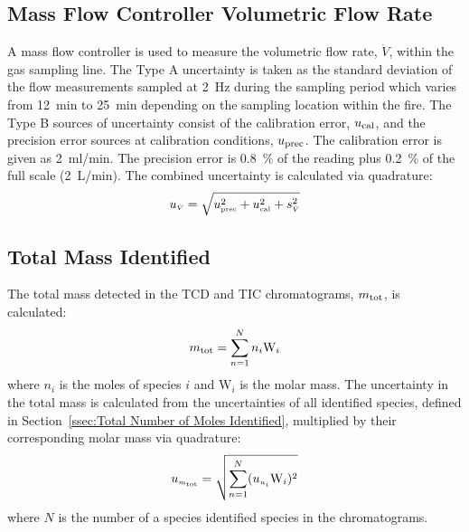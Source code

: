 \documentclass[12pt]{article}
\begin{document}
\subsection{Mass Flow Controller Volumetric Flow Rate}
\label{ssec:Mass_Flow_Controller_Volumetric_Flow_Rate}

A mass flow controller is used to measure the volumetric flow rate, $\dot{V}$, within the gas sampling line. The Type A uncertainty is taken as the standard deviation of the flow measurements sampled at \SI{2}{Hz} during the sampling period which varies from \SI{12}{min} to \SI{25}{min} depending on the sampling location within the fire. The Type B sources of uncertainty consist of the calibration error, $u_{\rm cal}$, and the precision error sources at calibration conditions, $u_{\rm prec}$. The calibration error is given as 2~ml/min. The precision error is 0.8~\% of the reading plus 0.2~\% of the full scale (\SI{2}{L/min}). The combined uncertainty is calculated via quadrature:
\begin{equation}
\label{eq:volumetric_flow_uncertainty}
u_{\scriptscriptstyle \dot{V}} = \sqrt{u_{\rm \scriptscriptstyle prec}^2 + u_{\rm \scriptscriptstyle cal}^2 + s_{\scriptscriptstyle \dot{V}}^2}
\end{equation}

\subsection{Total Mass Identified}
\label{ssec:Total_Mass_Identified_into_GC/MS}
The total mass detected in the TCD and TIC chromatograms, $m_{\rm tot}$, is calculated:
\begin{equation}
\label{eq:total_mass_detected}
m_{\rm tot}=\sum_{n=1}^{N} n_{i}{\textrm{W}_{i}}
\end{equation}
where $n_{i}$ is the moles of species $i$ and ${\textrm{W}_{i}}$ is the molar mass.  The uncertainty in the total mass is calculated from the uncertainties of all identified species, defined in Section~\ref{ssec:Total Number of Moles Identified}, multiplied by their corresponding molar mass via quadrature:
\begin{equation}
\label{eq:total_mass_detected_uncertainty}
u_{\scriptscriptstyle m_{\rm tot}}=\sqrt{{\sum_{n=1}^{N} (u_{\scriptscriptstyle n_{i}}{\textrm{W}_{i}})^2}}
\end{equation}
where $N$ is the number of a species identified species in the chromatograms.

\end{document}
